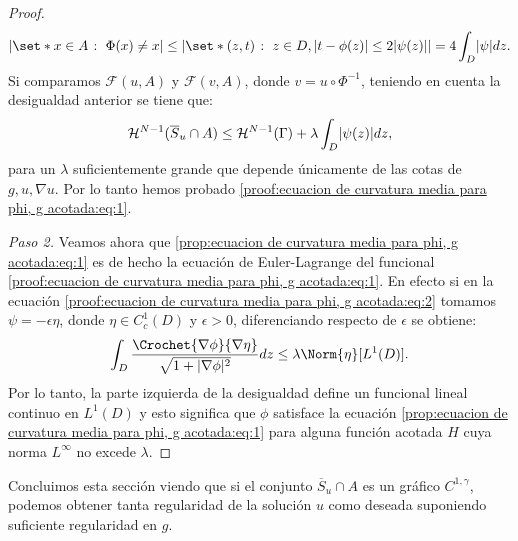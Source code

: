 \documentclass[a4paper,11pt,spanish, twoside, leqno]{tfm-uam}
\begin{document}
\begin{proof}
\begin{align*}
\abs{\set*{x\in A\given \Phi(x)\not = x}}\leq \abs{\set*{(z,t)\given z\in D, \abs{t-\phi(z)}\leq 2 \abs{\psi(z)}}}=4\int_{D}\abs{\psi}dz.
\end{align*}
Si comparamos $\mathcal{F}(u, A)$ y $\mathcal{F}(v, A)$, donde $v=u\circ \Phi^{-1}$, teniendo en cuenta la desigualdad anterior se tiene que:
\begin{align*}
\mathcal{H}^{N-1}(\overline{S}_{u}\cap A)\leq \mathcal{H}^{N-1}(\Gamma)+\lambda \int_{D}\lvert\psi(z)\rvert dz,
\end{align*}
para un $\lambda$ suficientemente grande que depende únicamente de las cotas de $g,u,\nabla{u}$. Por lo tanto hemos probado \ref{proof:ecuacion de curvatura media para phi, g acotada:eq:1}. 

\textit{Paso 2.} Veamos ahora que \ref{prop:ecuacion de curvatura media para phi, g acotada:eq:1} es de hecho la ecuación de Euler-Lagrange del funcional \ref{proof:ecuacion de curvatura media para phi, g acotada:eq:1}. En efecto si en la ecuación \ref{proof:ecuacion de curvatura media para phi, g acotada:eq:2} tomamos $\psi=-\epsilon \eta$, donde $\eta\in C^{1}_{c}(D)$ y $\epsilon>0$, diferenciando respecto de $\epsilon$ se obtiene:
\begin{align*}
\int_{D}\dfrac{\Crochet{\nabla{\phi}}{\nabla{\eta}}}{\sqrt{1+\abs{\nabla{\phi}}^{2}}}dz\leq \lambda \Norm{\eta}[L^{1}(D)].
\end{align*}
Por lo tanto, la parte izquierda de la desigualdad define un funcional lineal continuo en $L^{1}(D)$ y esto significa que $\phi$ satisface la ecuación \ref{prop:ecuacion de curvatura media para phi, g acotada:eq:1} para alguna función acotada $H$ cuya norma $L^{\infty}$ no excede $\lambda$.  
\end{proof}

Concluimos esta sección viendo que si el conjunto $\overline{S}_{u}\cap A$ es un gráfico $C^{1,\gamma}$, podemos obtener tanta regularidad de la solución $u$ como deseada suponiendo suficiente regularidad en $g$.
\end{document}
